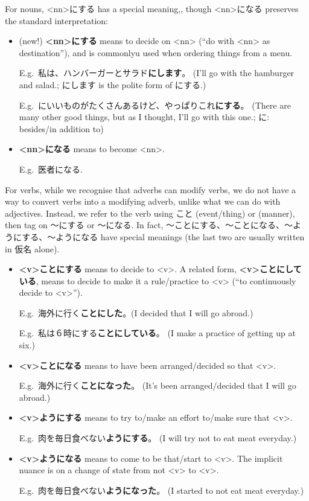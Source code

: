 \documentclass[../nihongo-gakushuu-kyouzai.tex]{subfiles}
\begin{document}
For nouns, <nn>にする has a special meaning,, though <nn>になる preserves the standard interpretation:
\begin{itemize}
    \item (new!) \textbf{<nn>にする} means to decide on <nn> (``do with <nn> as destination''), and is commonlyu used when ordering things from a menu.

    E.g.\ 私は、ハンバーガーとサラド\textbf{にします}。 (I'll go with the hamburger and salad.; にします is the polite form of にする.)

    E.g.\ にいいものがたくさんあるけど、やっぱりこれ\textbf{にする}。 (There are many other good things, but as I thought, I'll go with this one.; に: besides/in addition to)
    \item \textbf{<nn>になる} means to become <nn>.

    E.g.\ 医者になる.
\end{itemize}

For verbs, while we recognise that adverbs can modify verbs, we do not have a way to convert verbs into a modifying adverb, unlike what we can do with adjectives. Instead, we refer to the verb using こと (event/thing) or  (manner), then tag on 〜にする or 〜になる. In fact, 〜ことにする、〜ことになる、〜ようにする、〜ようになる have special meanings (the last two are usually written in 仮名 alone).


\begin{itemize}
    \item \textbf{<v>ことにする} means to decide to <v>. A related form, \textbf{<v>ことにしている}, means to decide to make it a rule/practice to <v> (``to continuously decide to <v>'').

    E.g.\ 海外に行く\textbf{ことにした}。(I decided that I will go abroad.)

    E.g.\ 私は６時にする\textbf{ことにしている}。 (I make a practice of getting up at six.)

    \item \textbf{<v>ことになる} means to have been arranged/decided so that <v>.

    E.g.\ 海外に行く\textbf{ことになった}。 (It's been arranged/decided that I will go abroad.)
    \item \textbf{<v>ようにする} means to try to/make an effort to/make sure that <v>.

    E.g.\ 肉を毎日食べない\textbf{ようにする}。 (I will try not to eat meat everyday.)
    \item \textbf{<v>ようになる} means to come to be that/start to <v>. The implicit nuance is on a change of state from not <v> to <v>.

    E.g.\ 肉を毎日食べない\textbf{ようになった}。 (I started to not eat meat everyday.)
\end{itemize}
\end{document}
